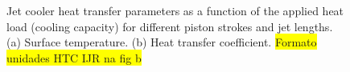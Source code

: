 \documentclass[review,preprint,12pt]{elsarticle}
\begin{document}
\begin{figure}[!htp]
\centering
{}
\hfil
{}
\caption{Jet cooler heat transfer parameters as a function of the applied heat load (cooling capacity) for different piston strokes and jet lengths. (a) Surface temperature. (b) Heat transfer coefficient. \colorbox{yellow}{Formato unidades HTC IJR na fig b}}
\label{fig:Figure_7}
\end{figure}
\end{document}
